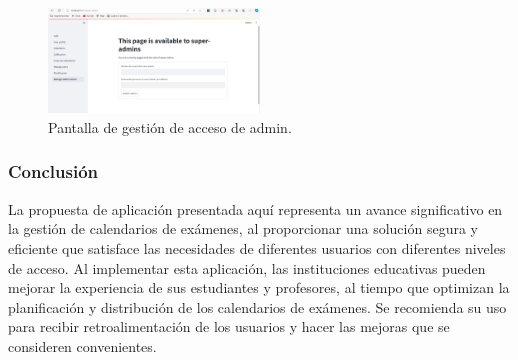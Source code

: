 \documentclass{article}
\begin{document}
\begin{figure}[h!] \centering \includegraphics[width=0.5\textwidth]{gestion_acceso_admin.png} \caption{Pantalla de gestión de acceso de admin.} \end{figure} 
\subsubsection{Conclusión}

La propuesta de aplicación presentada aquí representa un avance significativo en la gestión de calendarios de exámenes, al proporcionar una solución segura y eficiente que satisface las necesidades de diferentes usuarios con diferentes niveles de acceso. Al implementar esta aplicación, las instituciones educativas pueden mejorar la experiencia de sus estudiantes y profesores, al tiempo que optimizan la planificación y distribución de los calendarios de exámenes. Se recomienda su uso para recibir retroalimentación de los usuarios y hacer las mejoras que se consideren convenientes.
\end{document}
